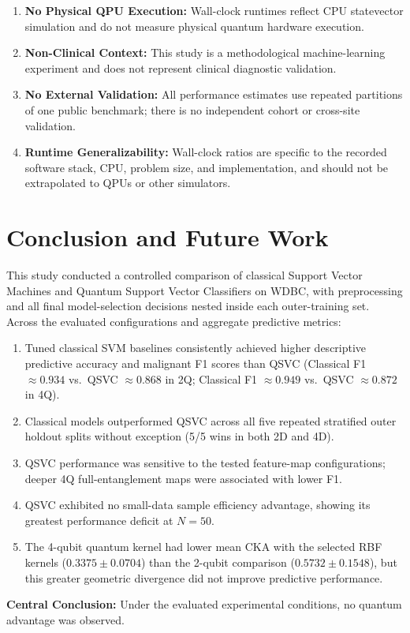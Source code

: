 \documentclass[12pt,a4paper]{article}
\begin{document}
\begin{enumerate}
    \item \textbf{No Physical QPU Execution:} Wall-clock runtimes reflect CPU statevector simulation and do not measure physical quantum hardware execution.
    \item \textbf{Non-Clinical Context:} This study is a methodological machine-learning experiment and does not represent clinical diagnostic validation.
    \item \textbf{No External Validation:} All performance estimates use repeated partitions of one public benchmark; there is no independent cohort or cross-site validation.
    \item \textbf{Runtime Generalizability:} Wall-clock ratios are specific to the recorded software stack, CPU, problem size, and implementation, and should not be extrapolated to QPUs or other simulators.
\end{enumerate}

\section{Conclusion and Future Work}
This study conducted a controlled comparison of classical Support Vector Machines and Quantum Support Vector Classifiers on WDBC, with preprocessing and all final model-selection decisions nested inside each outer-training set. Across the evaluated configurations and aggregate predictive metrics:
\begin{enumerate}
    \item Tuned classical SVM baselines consistently achieved higher descriptive predictive accuracy and malignant F1 scores than QSVC (Classical F1 $\approx 0.934$ vs.\ QSVC $\approx 0.868$ in 2Q; Classical F1 $\approx 0.949$ vs.\ QSVC $\approx 0.872$ in 4Q).
    \item Classical models outperformed QSVC across all five repeated stratified outer holdout splits without exception (5/5 wins in both 2D and 4D).
    \item QSVC performance was sensitive to the tested feature-map configurations; deeper 4Q full-entanglement maps were associated with lower F1.
    \item QSVC exhibited no small-data sample efficiency advantage, showing its greatest performance deficit at $N=50$.
    \item The 4-qubit quantum kernel had lower mean CKA with the selected RBF kernels ($0.3375 \pm 0.0704$) than the 2-qubit comparison ($0.5732 \pm 0.1548$), but this greater geometric divergence did not improve predictive performance.
\end{enumerate}
\textbf{Central Conclusion:} Under the evaluated experimental conditions, no quantum advantage was observed.
\end{document}
